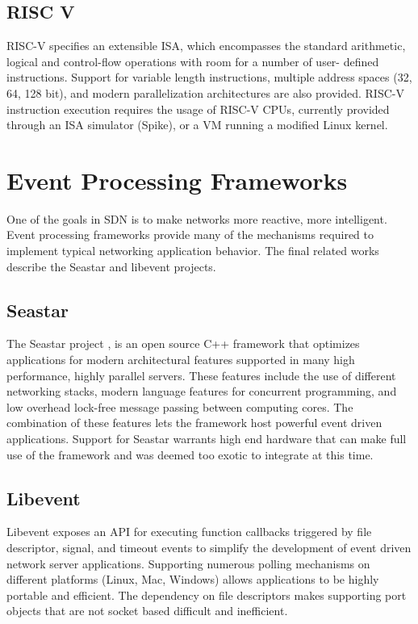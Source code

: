\subsection{RISC V}
\label{related:riscv}
RISC-V \cite{riscv} specifies an extensible ISA, which encompasses the standard
arithmetic, logical and control-flow operations with room for a number of user-
defined instructions. Support for variable length instructions, multiple
address spaces (32, 64, 128 bit), and modern parallelization architectures are
also provided. RISC-V instruction execution requires the usage of RISC-V CPUs,
currently provided through an ISA simulator (Spike), or a VM running a modified
Linux kernel.

\section{Event Processing Frameworks}
\label{related:event}
One of the goals in SDN is to make networks more reactive, more intelligent.
Event processing frameworks provide many of the mechanisms required to implement
typical networking application behavior. The final related works describe the
Seastar and libevent projects.

\subsection{Seastar}
\label{related:seastar}
The Seastar project \cite{seastar}, is an open source C++ framework that
optimizes applications for modern architectural features supported in many high
performance, highly parallel servers. These features include the use of different
networking stacks, modern language features for concurrent programming, and low
overhead lock-free message passing between computing cores. The combination of
these features lets the framework host powerful event driven applications.
Support for Seastar warrants high end hardware that can make full use of the
framework and was deemed too exotic to integrate at this time.


\subsection{Libevent}
\label{related:libevent}
Libevent \cite{libevent} exposes an API for executing function callbacks
triggered by file descriptor, signal, and timeout events to simplify the
development of event driven network server applications. Supporting numerous
polling mechanisms on different platforms (Linux, Mac, Windows) allows
applications to be highly portable and efficient. The dependency on file
descriptors makes supporting port objects that are not socket based difficult
and inefficient.
